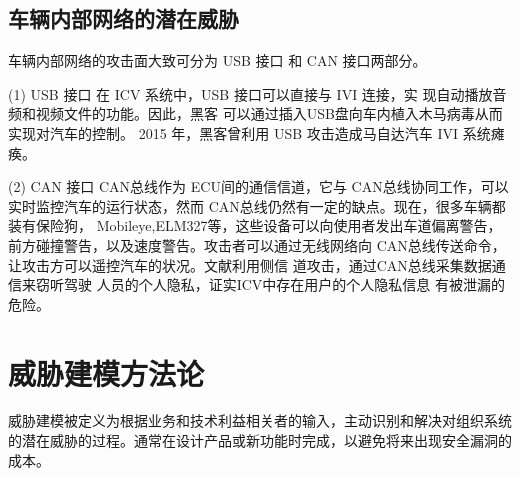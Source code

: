 \subsection{车辆内部网络的潜在威胁}
车辆内部网络的攻击面大致可分为 USB 接口
和 CAN 接口两部分。

(1) USB 接口
在 ICV 系统中，USB 接口可以直接与 IVI 连接，实
现自动播放音频和视频文件的功能。因此，黑客
可以通过插入USB盘向车内植入木马病毒从而实现对汽车的控制。
2015 年，黑客曾利用 USB 攻击造成马自达汽车 IVI
系统瘫痪。

(2) CAN 接口
CAN总线作为 ECU间的通信信道，它与 CAN总线协同工作，可以实时监控汽车的运行状态，然而 CAN总线仍然有一定的缺点。现在，很多车辆都装有保险狗， Mobileye,ELM327等，这些设备可以向使用者发出车道偏离警告，前方碰撞警告，以及速度警告。攻击者可以通过无线网络向 CAN总线传送命令，让攻击方可以遥控汽车的状况。文献\cite{koscher2010experimental}利用侧信
道攻击，通过CAN总线采集数据通信来窃听驾驶
人员的个人隐私，证实ICV中存在用户的个人隐私信息
有被泄漏的危险。

\section{威胁建模方法论}
威胁建模被定义为根据业务和技术利益相关者的输入，主动识别和解决对组织系统的潜在威胁的过程。通常在设计产品或新功能时完成，以避免将来出现安全漏洞的成本。

